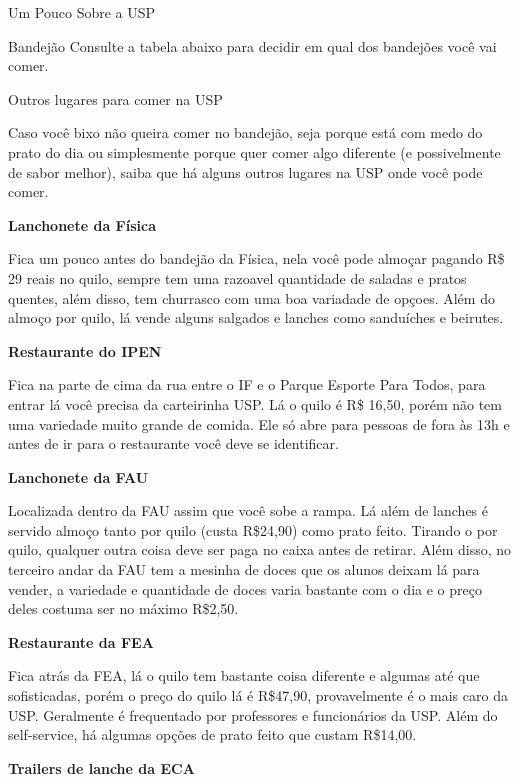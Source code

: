 \begin{secao}{Um Pouco Sobre a USP}
\begin{subsecao}{Bandejão}
Consulte a tabela abaixo para decidir em qual dos bandejões você vai comer.


\pagebreak

\end{subsecao}

\begin{subsecao}{Outros lugares para comer na USP}

Caso você bixo não queira comer no bandejão, seja porque está com medo do prato do dia
ou simplesmente porque quer comer algo diferente (e possivelmente de sabor melhor), saiba
que há alguns outros lugares na USP onde você pode comer.

{\bf Lanchonete da Física}

Fica um pouco antes do bandejão da Física, nela você pode almoçar pagando R\$ 29 reais no
quilo, sempre tem uma razoavel quantidade de saladas e pratos quentes, além disso, tem
churrasco com uma boa variadade de opçoes. 
Além do almoço por quilo, lá vende alguns salgados e lanches como sanduíches e beirutes.

{\bf Restaurante do IPEN}

Fica na parte de cima da rua entre o IF e o Parque Esporte Para Todos, para entrar lá você
precisa da carteirinha USP. Lá o quilo é R\$ 16,50, porém não tem uma variedade muito grande
de comida. Ele só abre para pessoas de fora às 13h e antes de ir para o restaurante você deve
se identificar.

{\bf Lanchonete da FAU}

Localizada dentro da FAU assim que você sobe a rampa. Lá além de lanches é servido almoço
tanto por quilo (custa R\$24,90) como prato feito. Tirando o por quilo, qualquer outra coisa
deve ser paga no caixa antes de retirar. Além disso, no terceiro andar da FAU tem a mesinha
de doces que os alunos deixam lá para vender, a variedade e quantidade de doces varia bastante
com o dia e o preço deles costuma ser no máximo R\$2,50.

{\bf Restaurante da FEA}

Fica atrás da FEA, lá o quilo tem bastante coisa diferente e algumas até que sofisticadas,
porém o preço do quilo lá é R\$47,90, provavelmente é o mais caro da USP. Geralmente
é frequentado por professores e funcionários da USP. Além do self-service,
há algumas opções de prato feito que custam R\$14,00.

{\bf Trailers de lanche da ECA}


\end{subsecao}
\end{secao}

